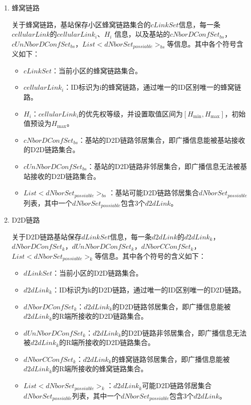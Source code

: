 \documentclass[figurelist,tablelist,algorithmlist,nomlist,masters]{seuthesix}
\begin{document}
	\begin{enumerate}
	\item 蜂窝链路


	关于蜂窝链路，基站保存小区蜂窝链路集合的$cLinkSet$信息，每一条$cellularLink$的$cellularLin{k_i}$、${H_i}$ 信息，以及基站的$cNborDConfSe{t_{bs}}$，$cUnNborDConfSe{t_{bs}}$，$List < dNborSe{t_{possiable}}{ > _{bs}}$等信息。其中各个符号含义如下：

	\begin{itemize}
	\item $cLinkSet$：当前小区的蜂窝链路集合。
	\item $cellularLin{k_i}$：ID标识为i的蜂窝链路，通过唯一的ID区别唯一的蜂窝链路。
	\item ${H_i}$：$cellularLin{k_i}$的优先权等级，并设置取值区间为$\left[ {{H_{\min }},{H_{\max }}} \right]$，初始值预设为${H_{\max }}$。
	\item $cNborDConfSe{t_{bs}}$：基站的D2D链路邻居集合，即广播信息能被基站接收的D2D链路集合。
	\item $cUnNborDConfSe{t_{bs}}$：基站的D2D链路非邻居集合，即广播信息无法被基站接收的D2D链路集合。
	\item $List < dNborSe{t_{possiable}}{ > _{bs}}$：基站可能D2D链路邻居集合$dNborSe{t_{possiable}}$列表，其中一个$dNborSe{t_{possiable}}$包含3个$d2dLink$。
	\end{itemize}


	\item D2D链路

	关于D2D链路基站保存$dLinkSet$信息，每一条$d2dLink$的$d2dLin{k_k}$，$dNborDConfSe{t_k}$，$dUnNborDConfSe{t_k}$，$dNborCConfSe{t_k}$，$List < dNborSe{t_{possiable}}{ > _k}$等信息。其中各个符号的含义如下：
	\begin{itemize}
	\item $dLinkSet$：当前小区的D2D链路集合。
	\item $d2dLin{k_k}$：ID标识为k的D2D链路，通过唯一的ID区别唯一的D2D链路。
	\item $dNborDConfSe{t_k}$：$d2dLin{k_k}$的D2D链路邻居集合，即广播信息能被$d2dLin{k_k}$的R端所接收的D2D链路集合。
	\item $dUnNborDConfSe{t_k}$：$d2dLin{k_k}$的D2D链路非邻居集合，即广播信息无法被$d2dLin{k_k}$的R端所接收的D2D链路集合。
	\item $dNborCConfSe{t_k}$：$d2dLin{k_k}$的蜂窝链路邻居集合，即广播信息能被$d2dLin{k_k}$的R端所接收的蜂窝链路集合。
	\item $List < dNborSe{t_{possiable}}{ > _k}$：$d2dLin{k_k}$可能D2D链路邻居集合$dNborSe{t_{possiable}}$列表，其中一个$dNborSe{t_{possiable}}$包含3个$d2dLink$。
	\end{itemize}

	\end{enumerate}
	
\end{document}
